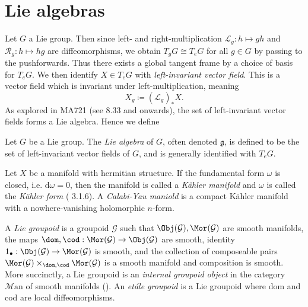 \section{Lie algebras}



Let $G$ a Lie group. Then since left- and right-multiplication $\mathcal{L} _g : h\mapsto gh$ and $\mathcal{R} _g : h\mapsto hg$ are diffeomorphisms, we obtain $T_gG\cong T_eG$ for all $g\in G$ by passing to the pushforwards. Thus there exists a global tangent frame by a choice of basis for $T_eG$. We then identify $X\in T_eG$ with \emph{left-invariant vector field}. This is a vector field which is invariant under left-multiplication, meaning
\[
	X_g\coloneqq (\mathcal{L} _g)_*X
.\]
As explored in MA721 (see \cite{lee} 8.33 and onwards), the set of left-invariant vector fields forms a Lie algebra. Hence we define
\begin{definition}\label{1.2.1}
	Let $G$ be a Lie group. The \emph{Lie algebra} of $G$, often denoted $\mathfrak{g} $, is defined to be the set of left-invariant vector fields of $G$, and is generally identified with $T_eG$.
\end{definition}

\begin{definition}\label{1.2.2}
	Let $X$ be a manifold with hermitian structure. If the fundamental form $\omega $ is closed, i.e. $\mathrm{d} \omega =0$, then the manifold is called a \emph{K\"ahler manifold} and $\omega $ is called the \emph{K\"ahler form} (\cite{huybrechts} 3.1.6). A \emph{Calabi-Yau maniold} is a compact K\"ahler manifold with a nowhere-vanishing holomorphic $n$-form.
\end{definition}


\begin{definition}\label{1.2.3}
	A \emph{Lie groupoid} is a groupoid $\mathcal{G} $ such that $\Obj(\mathcal{G} ) ,\Mor(\mathcal{G} )$ are smooth manifolds, the maps $\dom, \cod : \Mor(\mathcal{G} ) \to \Obj(\mathcal{G} ) $ are smooth, identity $1_{\bullet} : \Obj(\mathcal{G} )  \to \Mor(\mathcal{G} )$ is smooth, and the collection of composeable pairs $\Mor(\mathcal{G} )\times_{\dom,\cod} \Mor(\mathcal{G} )$ is a smooth manifold and composition is smooth. More succinctly, a Lie groupoid is an \emph{internal groupoid object} in the category $\mathcal{M} \mathrm{an} $ of smooth manifolds (\cite{nlab:groupoid_object}). An \emph{et\'ale groupoid} is a Lie groupoid where dom and cod are local diffeomorphisms.
\end{definition}

